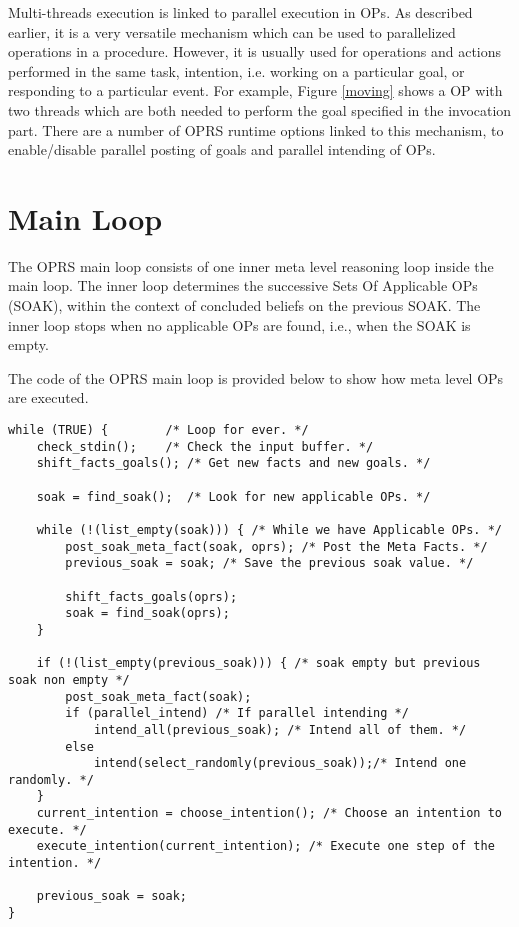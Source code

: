 Multi-threads execution is linked to parallel execution in OPs. As
described earlier, it is a very versatile mechanism which can be used to
parallelized operations in a procedure. However, it is usually used for
operations and actions performed in the same task, intention, i.e. working on a
particular goal, or responding to a particular event. For example, Figure
\ref{moving} shows a OP with two threads which are both needed to perform the
goal specified in the invocation part. There are a number of OPRS runtime
options linked to this mechanism, to enable/disable parallel posting of goals
and parallel intending of OPs.

\section{\CPK{} Main Loop}

The OPRS main loop consists of one inner meta level reasoning loop
inside the main loop. The inner loop determines
the successive Sets Of Applicable OPs (SOAK), within the context of
concluded beliefs on the previous SOAK. The inner loop stops when no
applicable OPs are found, i.e., when the SOAK is empty.

The code of the OPRS main loop is provided below to show how meta level OPs are 
executed.

\begin{verbatim}
while (TRUE) {        /* Loop for ever. */
    check_stdin();    /* Check the input buffer. */
    shift_facts_goals(); /* Get new facts and new goals. */

    soak = find_soak();  /* Look for new applicable OPs. */

    while (!(list_empty(soak))) { /* While we have Applicable OPs. */
        post_soak_meta_fact(soak, oprs); /* Post the Meta Facts. */
        previous_soak = soak; /* Save the previous soak value. */

        shift_facts_goals(oprs);
        soak = find_soak(oprs);
    }

    if (!(list_empty(previous_soak))) { /* soak empty but previous soak non empty */
        post_soak_meta_fact(soak);
        if (parallel_intend) /* If parallel intending */
            intend_all(previous_soak); /* Intend all of them. */
        else
            intend(select_randomly(previous_soak));/* Intend one randomly. */
    }
    current_intention = choose_intention(); /* Choose an intention to execute. */
    execute_intention(current_intention); /* Execute one step of the intention. */

    previous_soak = soak;
}
\end{verbatim}

